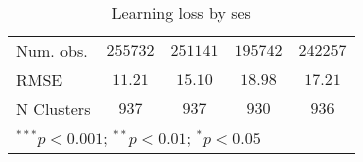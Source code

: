 \begin{table}
\begin{center}
\begin{tabular}{l c c c c}
Num. obs.                   & $255732$      & $251141$      & $195742$      & $242257$      \\
RMSE                        & $11.21$       & $15.10$       & $18.98$       & $17.21$       \\
N Clusters                  & $937$         & $937$         & $930$         & $936$         \\
\hline
\multicolumn{5}{l}{\scriptsize{$^{***}p<0.001$; $^{**}p<0.01$; $^{*}p<0.05$}}
\end{tabular}
\caption{Learning loss by ses}
\label{tableses}
\end{center}
\end{table}
